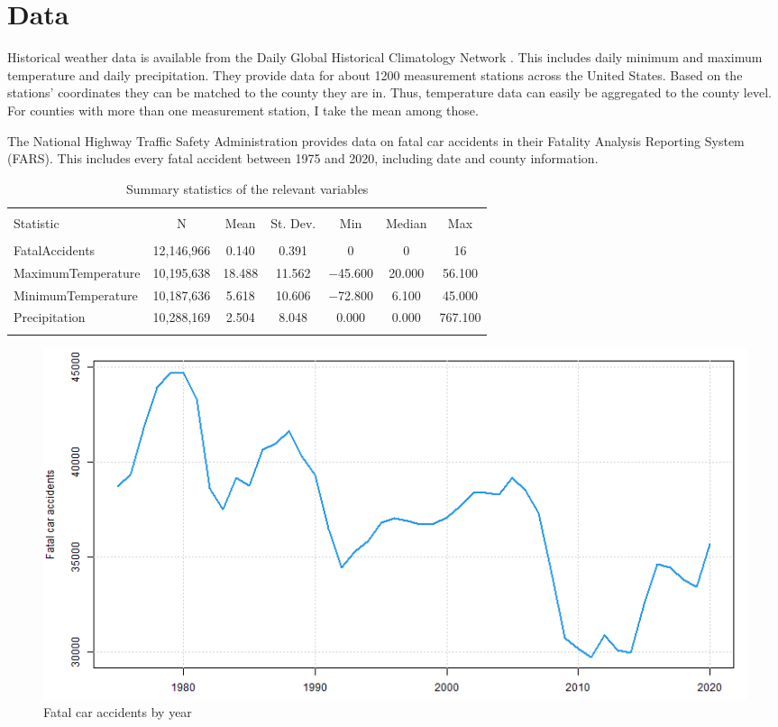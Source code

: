 
\section{Data}

Historical weather data is available from the Daily Global Historical Climatology Network \citep{Menne_2012}. This includes daily minimum and maximum temperature and daily precipitation. They provide data for about 1200 measurement stations across the United States. Based on the stations' coordinates they can be matched to the county they are in. Thus, temperature data can easily be aggregated to the county level. For counties with more than one measurement station, I take the mean among those.

The National Highway Traffic Safety Administration provides data on fatal car accidents in their Fatality Analysis Reporting System (FARS). This includes every fatal accident between 1975 and 2020, including date and county information.

\begin{table}[!htbp] \centering 
	\caption{Summary statistics of the relevant variables} 
	\label{} 
	\begin{tabular}{@{\extracolsep{5pt}}lcccccc} 
		\\[-1.8ex]\hline 
		\hline \\[-1.8ex] 
		Statistic & \multicolumn{1}{c}{N} & \multicolumn{1}{c}{Mean} & \multicolumn{1}{c}{St. Dev.} & \multicolumn{1}{c}{Min} & \multicolumn{1}{c}{Median} & \multicolumn{1}{c}{Max} \\ 
		\hline \\[-1.8ex] 
		FatalAccidents & 12,146,966 & 0.140 & 0.391 & 0 & 0 & 16 \\ 
		MaximumTemperature & 10,195,638 & 18.488 & 11.562 & $-$45.600 & 20.000 & 56.100 \\ 
		MinimumTemperature & 10,187,636 & 5.618 & 10.606 & $-$72.800 & 6.100 & 45.000 \\ 
		Precipitation & 10,288,169 & 2.504 & 8.048 & 0.000 & 0.000 & 767.100 \\ 
		\hline \\[-1.8ex] 
	\end{tabular} 
\end{table}

\begin{figure}[h]
	\centering
	\includegraphics[scale = 0.5]{"../Code & Data/FatalAccidentsYearly.png"}
	\caption{Fatal car accidents by year}
	\label{YearlyAccs}
\end{figure} 

